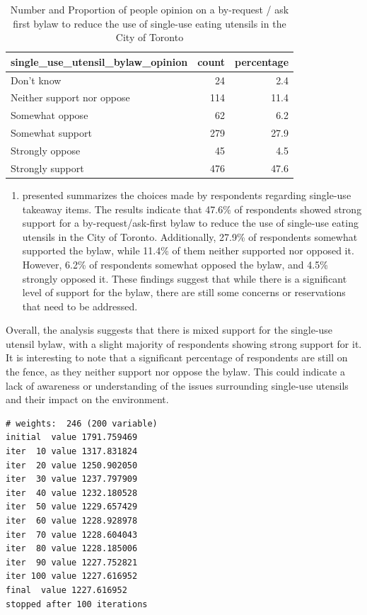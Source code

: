 \documentclass[
  letterpaper,
  DIV=11,
  numbers=noendperiod]{scrartcl}
\providecommand{\tightlist}{%
  \setlength{\itemsep}{0pt}\setlength{\parskip}{0pt}}\usepackage{longtable,booktabs,array}
\begin{document}
\hypertarget{tbl-number}{}
\begin{table}
\caption{\label{tbl-number}Number and Proportion of people opinion on a by-request / ask first
bylaw to reduce the use of single-use eating utensils in the City of
Toronto }\tabularnewline

\centering
\begin{tabular}{l|r|r}
\hline
single\_use\_utensil\_bylaw\_opinion & count & percentage\\
\hline
Don't know & 24 & 2.4\\
\hline
Neither support nor oppose & 114 & 11.4\\
\hline
Somewhat oppose & 62 & 6.2\\
\hline
Somewhat support & 279 & 27.9\\
\hline
Strongly oppose & 45 & 4.5\\
\hline
Strongly support & 476 & 47.6\\
\hline
\end{tabular}
\end{table}

\begin{enumerate}
\def\labelenumi{(\arabic{enumi})}
\tightlist
\item
  presented summarizes the choices made by respondents regarding
  single-use takeaway items. The results indicate that 47.6\% of
  respondents showed strong support for a by-request/ask-first bylaw to
  reduce the use of single-use eating utensils in the City of Toronto.
  Additionally, 27.9\% of respondents somewhat supported the bylaw,
  while 11.4\% of them neither supported nor opposed it. However, 6.2\%
  of respondents somewhat opposed the bylaw, and 4.5\% strongly opposed
  it. These findings suggest that while there is a significant level of
  support for the bylaw, there are still some concerns or reservations
  that need to be addressed.
\end{enumerate}

Overall, the analysis suggests that there is mixed support for the
single-use utensil bylaw, with a slight majority of respondents showing
strong support for it. It is interesting to note that a significant
percentage of respondents are still on the fence, as they neither
support nor oppose the bylaw. This could indicate a lack of awareness or
understanding of the issues surrounding single-use utensils and their
impact on the environment.

\begin{verbatim}
# weights:  246 (200 variable)
initial  value 1791.759469 
iter  10 value 1317.831824
iter  20 value 1250.902050
iter  30 value 1237.797909
iter  40 value 1232.180528
iter  50 value 1229.657429
iter  60 value 1228.928978
iter  70 value 1228.604043
iter  80 value 1228.185006
iter  90 value 1227.752821
iter 100 value 1227.616952
final  value 1227.616952 
stopped after 100 iterations
\end{verbatim}
\end{document}
